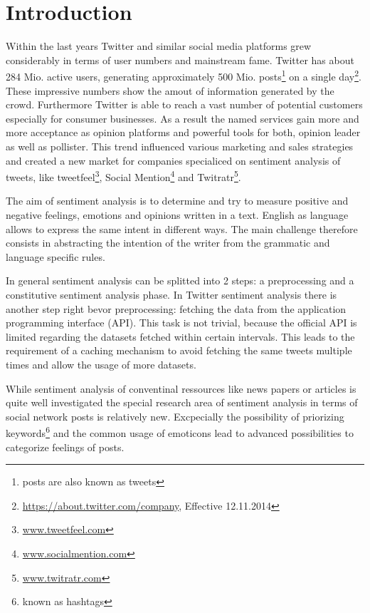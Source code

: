 \section{Introduction}


Within the last years Twitter and similar social media platforms grew considerably in terms of user numbers and mainstream fame. Twitter has about 284 Mio. active users, generating approximately 500 Mio. posts\footnote{posts are also known as tweets} on a single day\footnote{\url{https://about.twitter.com/company}, Effective 12.11.2014}. These impressive numbers show the amout of information generated by the crowd. Furthermore Twitter is able to reach a vast number of potential customers especially for consumer businesses. As a result the named services gain more and more acceptance as opinion platforms and powerful tools for both, opinion leader as well as pollister. This trend influenced various marketing and sales strategies and created a new market for companies specialiced on sentiment analysis of tweets, like tweetfeel\footnote{\url{www.tweetfeel.com}}, Social Mention\footnote{\url{www.socialmention.com}} and Twitratr\footnote{\url{www.twitratr.com}}.


The aim of sentiment analysis is to determine and try to measure positive and negative feelings, emotions and opinions written in a text. English as language allows to express the same intent in different ways. The main challenge therefore consists in abstracting the intention of the writer from the grammatic and language specific rules. 

In general sentiment analysis can be splitted into 2 steps: a preprocessing and a constitutive sentiment analysis phase. In Twitter sentiment analysis there is another step right bevor preprocessing: fetching the data from the application programming interface (API). This task is not trivial, because the official API is limited regarding the datasets fetched within certain intervals. This leads to the requirement of a caching mechanism to avoid fetching the same tweets multiple times and allow the usage of more datasets.



While sentiment analysis of conventinal ressources like news papers or articles is quite well investigated the special research area of sentiment analysis in terms of social network posts is relatively new. Excpecially the possibility of priorizing keywords\footnote{known as hashtags} and the common usage of emoticons lead to advanced possibilities to categorize feelings of posts.




